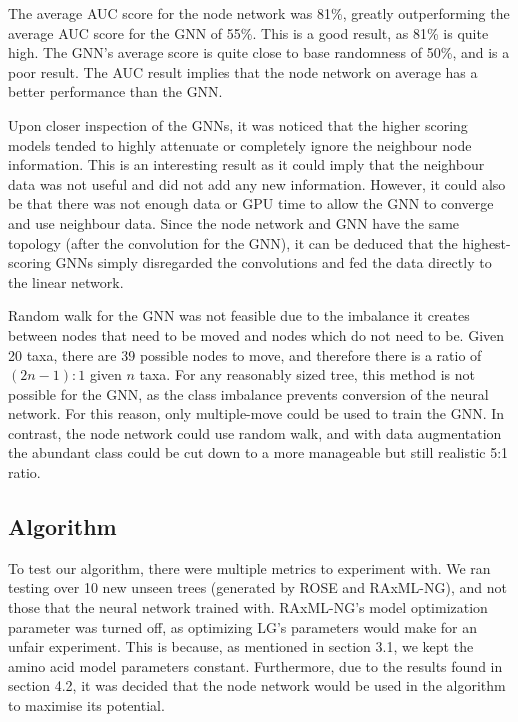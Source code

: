 \documentclass{mpaper}
\begin{document}
The average AUC score for the node network was 81\%, greatly outperforming the average AUC score for the GNN of 55\%. This is a good result, as 81\% is quite high. The GNN's average score is quite close to base randomness of 50\%, and is a poor result. The AUC result implies that the node network on average has a better performance than the GNN.

Upon closer inspection of the GNNs, it was noticed that the higher scoring models tended to highly attenuate or completely ignore the neighbour node information. This is an interesting result as it could imply that the neighbour data was not useful and did not add any new information. However, it could also be that there was not enough data or GPU time to allow the GNN to converge and use neighbour data. Since the node network and GNN have the same topology (after the convolution for the GNN), it can be deduced that the highest-scoring GNNs simply disregarded the convolutions and fed the data directly to the linear network.

Random walk for the GNN was not feasible due to the imbalance it creates between nodes that need to be moved and nodes which do not need to be. Given 20 taxa, there are 39 possible nodes to move, and therefore there is a ratio of $(2n-1):1$ given $n$ taxa. For any reasonably sized tree, this method is not possible for the GNN, as the class imbalance prevents conversion of the neural network. For this reason, only multiple-move could be used to train the GNN. In contrast, the node network could use random walk, and with data augmentation the abundant class could be cut down to a more manageable but still realistic 5:1 ratio.

\subsection{Algorithm}

To test our algorithm, there were multiple metrics to experiment with. We ran testing over 10 new unseen trees (generated by ROSE and RAxML-NG), and not those that the neural network trained with. RAxML-NG's model optimization parameter was turned off, as optimizing LG's parameters would make for an unfair experiment. This is because, as mentioned in section 3.1, we kept the amino acid model parameters constant. Furthermore, due to the results found in section 4.2, it was decided that the node network would be used in the algorithm to maximise its potential. 
\end{document}
